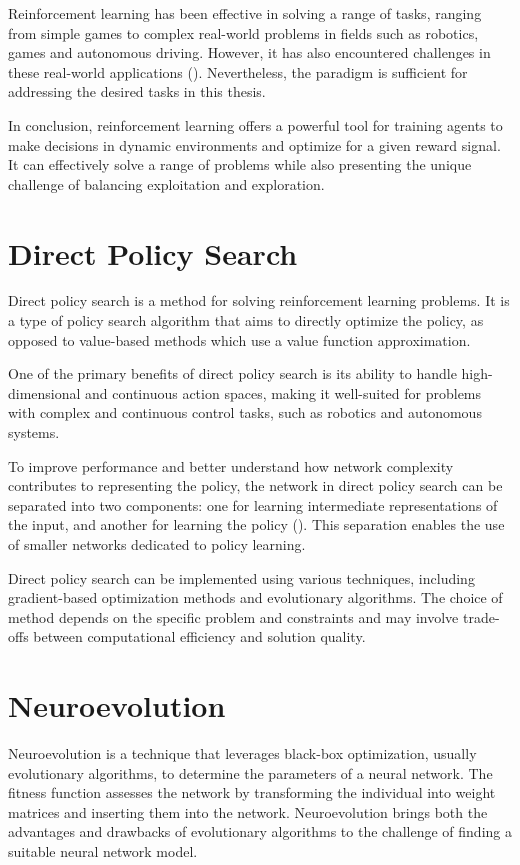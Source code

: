 Reinforcement learning has been effective in solving a range of tasks, ranging from simple games to complex real-world problems in fields such as robotics, games and autonomous driving. However, it has also encountered challenges in these real-world applications (\cite{zhu_ingredients_2020}). Nevertheless, the paradigm is sufficient for addressing the desired tasks in this thesis.

In conclusion, reinforcement learning offers a powerful tool for training agents to make decisions in dynamic environments and optimize for a given reward signal. It can effectively solve a range of problems while also presenting the unique challenge of balancing exploitation and exploration.

\section{Direct Policy Search}
Direct policy search is a method for solving reinforcement learning problems. It is a type of policy search algorithm that aims to directly optimize the policy, as opposed to value-based methods which use a value function approximation.

One of the primary benefits of direct policy search is its ability to handle high-dimensional and continuous action spaces, making it well-suited for problems with complex and continuous control tasks, such as robotics and autonomous systems.

To improve performance and better understand how network complexity contributes to representing the policy, the network in direct policy search can be separated into two components: one for learning intermediate representations of the input, and another for learning the policy (\cite{cuccu_playing_2019}). This separation enables the use of smaller networks dedicated to policy learning.

Direct policy search can be implemented using various techniques, including gradient-based optimization methods and evolutionary algorithms. The choice of method depends on the specific problem and constraints and may involve trade-offs between computational efficiency and solution quality.

\section{Neuroevolution}

Neuroevolution  is a technique that leverages black-box optimization, usually evolutionary algorithms, to determine the parameters of a neural network. The fitness function assesses the network by transforming the individual into weight matrices and inserting them into the network. Neuroevolution brings both the advantages and drawbacks of evolutionary algorithms to the challenge of finding a suitable neural network model.

